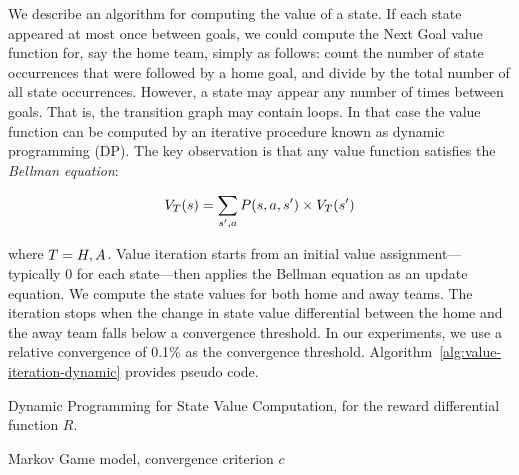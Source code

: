 We describe an algorithm for computing the value of a state. If each state appeared at most once between goals, we could compute the Next Goal value function for, say the home team, simply as follows: count the number of state occurrences that were followed by a home goal, and divide by the total number of all state occurrences. However, a state may appear any number of times between goals. That is, the transition graph may contain loops. In that case the value function can be computed by an iterative procedure known as dynamic programming (DP). The key observation is that any value function satisfies the {\em Bellman equation}:

\begin{equation} \label{eq:bellman}
V_{T}(s) =  \sum_{s',a} P(s,a,s') \times V_{T}(s')
\end{equation}

where $T = H,A$. Value iteration starts from an initial value assignment---typically 0 for each state---then applies the Bellman equation as an update equation. We compute the state values for both home and away teams. The iteration stops when the change in state value differential between the home and the away team falls below a convergence threshold. In our experiments, we use a relative convergence of 0.1\% as the convergence threshold. Algorithm~\ref{alg:value-iteration-dynamic} provides pseudo code. 




\begin{algorithm}
\caption{Dynamic Programming for State Value Computation, for the reward differential function $R$.}
\label{alg:value-iteration-dynamic}
\begin{algorithmic}[1]
\REQUIRE Markov Game model, convergence criterion $c$
    

    \ENDFOR
    \ENDFOR
 \ENDIF
\ENDFOR
\end{algorithmic}
\end{algorithm}


